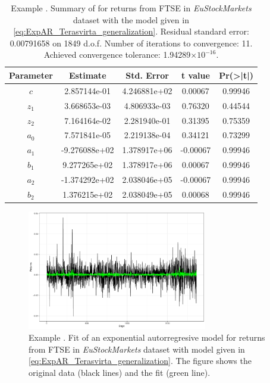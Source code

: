 \begin{table}[htb]
\centering
\begin{tabular}{ccccc}
\toprule
Parameter &  Estimate & Std. Error & t value & Pr(>|t|)\\    
\midrule     
$c$  &  2.857144e-01  &  4.246881e+02  &  0.00067  &  0.99946  \\
$z_1$  & 3.668653e-03  &  4.806933e-03  &  0.76320  &  0.44544  \\
$z_2$ &  7.164164e-02  &  2.281940e-01  &  0.31395  &  0.75359  \\
$a_0$ &  7.571841e-05  &  2.219138e-04  &  0.34121  &  0.73299  \\
$a_1$ & -9.276088e+02  &  1.378917e+06  &  -0.00067  &  0.99946  \\
$b_1$ &  9.277265e+02  &  1.378917e+06  &  0.00067  &  0.99946  \\
$a_2$ & -1.374292e+02  &  2.038046e+05  &  -0.00067  &  0.99946  \\
$b_2$ &  1.376215e+02  &  2.038049e+05  &  0.00068  &  0.99946  \\
\bottomrule
\end{tabular} 
\caption{Example . Summary of  for returns from FTSE in \textit{EuStockMarkets} dataset with the model given in \eqref{eq:ExpAR_Terasvirta_generalization}. Residual standard error: 0.00791658 on 1849 d.o.f. Number of iterations to convergence: 11. Achieved convergence tolerance: 1.94289$\times 10^{-16}$.}
\label{t:expAR_summary_TAC_real_data}
\end{table}




\begin{figure}[htb]
\centering
\includegraphics[width=0.7\textwidth]{example6.pdf}
\caption{Example . Fit of an exponential autorregresive model for returns from FTSE in \textit{EuStockMarkets} dataset with model given in \eqref{eq:ExpAR_Terasvirta_generalization}. The figure shows the original data (black lines) and the  fit (green line).}
\label{fig:expAR_real_data}
\end{figure}


